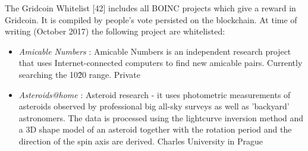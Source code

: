 The Gridcoin Whitelist [42] includes all BOINC projects which give a reward in Gridcoin. It is compiled by people's vote persisted on the blockchain. At time of writing (October 2017) the following project are whitelisted:\\

\begin{itemize}
	\item {\em Amicable Numbers} : Amicable Numbers is an independent research project that uses Internet-connected computers to find new amicable pairs. Currently searching the 10\^20 range.	Private	
	\item {\em Asteroids@home} : Asteroid research - it uses photometric measurements of asteroids observed by professional big all-sky surveys as well as 'backyard' astronomers. The data is processed using the lightcurve inversion method and a 3D shape model of an asteroid together with the rotation period and the direction of the spin axis are derived.	Charles University in Prague
	

\end{itemize}
